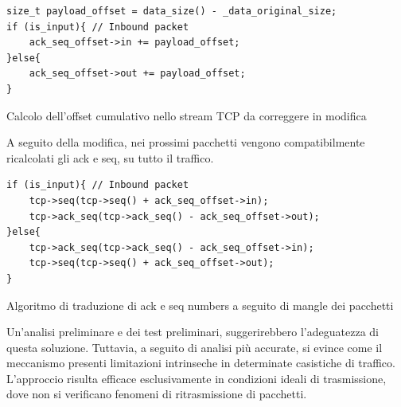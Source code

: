 \begin{listing}[H]
\begin{verbatim}
size_t payload_offset = data_size() - _data_original_size;
if (is_input){ // Inbound packet
    ack_seq_offset->in += payload_offset;
}else{
    ack_seq_offset->out += payload_offset;
}
\end{verbatim}
\vspace{-1em}
\caption{Calcolo dell'offset cumulativo nello stream TCP da correggere in modifica}\label{lst:tcp_ack_seq_transl}
\end{listing}
A seguito della modifica, nei prossimi pacchetti vengono compatibilmente ricalcolati gli \gls{ack} e \gls{seq}, su tutto il traffico.
\begin{listing}[H]
\begin{verbatim}
if (is_input){ // Inbound packet
    tcp->seq(tcp->seq() + ack_seq_offset->in);
    tcp->ack_seq(tcp->ack_seq() - ack_seq_offset->out);
}else{
    tcp->ack_seq(tcp->ack_seq() - ack_seq_offset->in);
    tcp->seq(tcp->seq() + ack_seq_offset->out);
}
\end{verbatim}
\vspace{-1em}
\caption{Algoritmo di traduzione di \gls{ack} e \gls{seq} numbers a seguito di mangle dei pacchetti}\label{lst:tcp_ack_seq_transl_fixing}
\end{listing}
Un'analisi preliminare e dei test preliminari, suggerirebbero l'adeguatezza di questa soluzione. Tuttavia, a seguito di analisi più accurate, si evince come il meccanismo presenti limitazioni intrinseche in determinate casistiche di traffico. L'approccio risulta efficace esclusivamente in condizioni ideali di trasmissione, dove non si verificano fenomeni di ritrasmissione di pacchetti.

